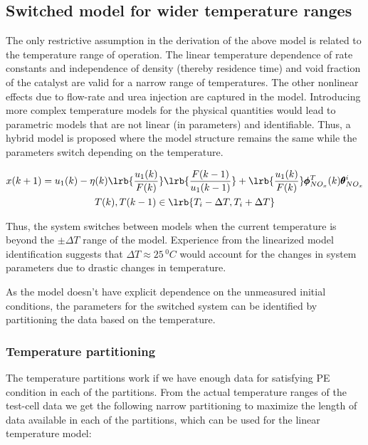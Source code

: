 \subsection{Switched model for wider temperature ranges}

The only restrictive assumption in the derivation of the above model is related to the temperature range of operation.
The linear temperature dependence of rate constants and independence of density (thereby residence time) and void
fraction of the catalyst are valid for a narrow range of temperatures. The other nonlinear effects due to flow-rate and
urea injection are captured in the model. Introducing more complex temperature models for the physical quantities would
lead to parametric models that are not linear (in parameters) and identifiable. Thus, a hybrid model is proposed where
the model structure remains the same while the parameters switch depending on the temperature.

\begin{multline}
        x(k+1) = u_1(k) - \eta(k) \lrb{\frac{u_1(k)}{F(k)}} \lrb{\frac{F(k-1)}{u_1(k-1)}}
                        + \lrb{\frac{u_1(k)}{F(k)}} \pmb \phi^{T}_{NO_x}(k) \pmb \theta^i_{NO_x}
        \\
        T(k), T(k-1) \in \lrb{T_i-\Delta T, T_i + \Delta T}
\end{multline}

Thus, the system switches between models when the current temperature is beyond the $\pm \Delta T$ range of the model.
Experience from the linearized model identification suggests that $\Delta T \approx 25 \, ^0C$ would account for
the changes in system parameters due to drastic changes in temperature.

As the model doesn't have explicit dependence on the unmeasured initial conditions, the parameters for the switched system can be identified by partitioning the data based on the temperature.

\subsubsection{Temperature partitioning}

The temperature partitions work if we have enough data for satisfying PE condition in each of the partitions. From the actual temperature ranges of the test-cell data we get the following narrow partitioning to maximize the length of data available in each of the partitions, which can be used for the linear temperature model:

